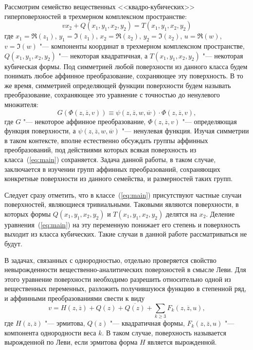 \documentclass[../main.tex]{subfiles}
\begin{document}
Рассмотрим семейство вещественных <<квадро-кубических>> гиперповерхностей в трехмерном комплексном пространстве:
\begin{equation}\label{eq:main}
v x_2 + Q(x_1, y_1, x_2, y_2) = T(x_1, y_1, x_2, y_2)
\end{equation}
где $x_1 = \Re(z_1)$, $y_1 = \Im(z_1)$, $x_2 = \Re(z_2)$, $y_2 = \Im(z_2)$, $u = \Re(w)$, $v= \Im(w)$ "--- компоненты координат в трехмерном комплексном пространстве, $Q(x_1, y_1, x_2, y_2)$ "--- некоторая квадратичная, а $T(x_1, y_1, x_2, y_2)$ "--- некоторая кубическая формы. Под симметрией любой поверхности из данного класса будем понимать любое аффинное преобразование, сохраняющее эту поверхность. В то же время, симметрией определяющей функции поверхности будем называть преобразование, сохраняющее это уравнение с точностью до ненулевого множителя:
\begin{equation}\label{eq:preservation}
G(\Phi(z, \overline{z}, v)) \equiv \psi(z, \overline{z}, w, \overline{w}) \cdot \Phi(z, \overline{z}, v),
\end{equation}
где $G$ "--- некоторое аффинное преобразование, $\Phi(z, \overline z, v)$ "--- определяющая функция поверхности, а $\psi(z, \overline z, w, \overline w)$ "--- ненулевая функция. Изучая симметрии в таком контексте, вполне естественно обсуждать группы аффинных преобразований, под действиями которых всякая поверхность из класса~(\ref{eq:main}) сохраняется. Задача данной работы, в таком случае, заключается в изучении групп аффинных преобразований, сохраняющих конкретные поверхности из данного семейства, и размерностей таких групп.

Следует сразу отметить, что в классе~(\ref{eq:main}) присутствуют частные случаи поверхностей, являющиеся тривиальными. Таковыми являются поверхности, в которых формы $Q(x_1, y_1, x_2, y_2)$ и $T(x_1, y_1, x_2, y_2)$ делятся на $x_2$. Деление уравнения~(\ref{eq:main}) на эту переменную понижает его степень и поверхность выходит из класса кубических. Такие случаи в данной работе рассматриваться не будут.

В задачах, связанных с однородностью, отдельно проверяется свойство невырожденности вещественно-аналитических поверхностей в смысле Леви. Для этого уравнение поверхности необходимо разрешить относительно одной из вещественных переменных, разложить получившуюся функцию в степенной ряд, и аффинными преобразованиями свести к виду
\begin{equation}
v = H(z, \overline z) + Q(z) + \overline{Q(z)} + \sum_{k \ge 3} F_k(z, \overline z, u),
\end{equation}
где $H(z, \overline z)$ "--- эрмитова, $Q(z)$ "--- квадратичная формы, $F_k(z, \overline z, u)$ "--- компонента однородности веса $k$. В таком случае, поверхность называется вырожденной по Леви, если эрмитова форма $H$ является вырожденной.
\end{document}
